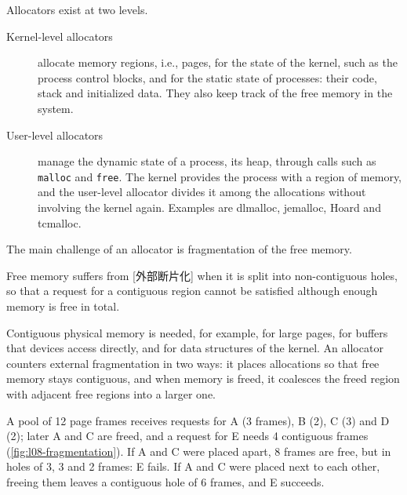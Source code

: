 \documentclass[../main.tex]{subfiles}
\begin{document}
Allocators exist at two levels.
\begin{description}
  \item[Kernel-level allocators] allocate memory regions, i.e., pages, for
    the state of the kernel, such as the process control blocks, and for the
    static state of processes: their code, stack and initialized data.  They
    also keep track of the free memory in the system.
  \item[User-level allocators] manage the dynamic state of a process, its
    heap, through calls such as \texttt{malloc} and \texttt{free}.  The
    kernel provides the process with a region of memory, and the user-level
    allocator divides it among the allocations without involving the kernel
    again.  Examples are dlmalloc, jemalloc, Hoard and
    tcmalloc.
\end{description}

The main challenge of an allocator is fragmentation of the free memory.

\begin{definition}
  Free memory suffers from [外部断片化] when
  it is split into non-contiguous holes, so that a request for a contiguous
  region cannot be satisfied although enough memory is free in total.
\end{definition}

Contiguous physical memory is needed, for example, for large pages, for
buffers that devices access directly, and for data structures of the
kernel.  An allocator counters external fragmentation in two ways: it
places allocations so that free memory stays contiguous, and when memory is
freed, it coalesces the freed region with adjacent free regions into a
larger one.

\begin{example}
  \label{ex:l08-fragmentation}
  A pool of 12 page frames receives requests for A (3 frames), B (2), C (3)
  and D (2); later A and C are freed, and a request for E needs 4
  contiguous frames (\cref{fig:l08-fragmentation}).  If A and C were placed
  apart, 8 frames are free, but in holes of 3, 3 and 2 frames: E fails.  If
  A and C were placed next to each other, freeing them leaves a contiguous
  hole of 6 frames, and E succeeds.
\end{example}
\end{document}

